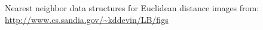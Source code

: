 \begin{frame}[fragile]{Nearest neighbor data structures for Euclidean distance}
\vspace{0.1in}
{\tiny
images from: \url{http://www.cs.sandia.gov/~kddevin/LB/figs}
}

%
%
%
%
%
\end{frame}


